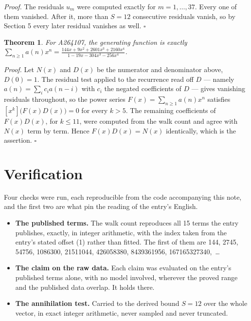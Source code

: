 \documentclass[11pt]{article}
\newtheorem{theorem}{Theorem}
\theoremstyle{definition}
\begin{document}
{\itshape Proof.} The residuals $u_m$ were computed exactly for $m = 1,\dots,37$. Every one of them vanished. After it, more than $S = 12$ consecutive residuals vanish, so by Section 5 every later residual vanishes as well. $\square$

\begin{theorem} For A264107, the generating function is exactly $\sum_{n\ge 1} a(n)x^n = \frac{144x + 9x^{2} + 2601x^{3} + 2160x^{4}}{1 - 19x - 304x^{3} - 256x^{4}}$.\end{theorem}

{\itshape Proof.} Let $N(x)$ and $D(x)$ be the numerator and denominator above, $D(0)=1$. The residual test applied to the recurrence read off $D$ --- namely $a(n) = \sum_i c_i a(n-i)$ with $c_i$ the negated coefficients of $D$ --- gives vanishing residuals throughout, so the power series $F(x)=\sum_{n\ge 1}a(n)x^n$ satisfies $[x^k]\bigl(F(x)D(x)\bigr) = 0$ for every $k > 5$. The remaining coefficients of $F(x)D(x)$, for $k \le 11$, were computed from the walk count and agree with $N(x)$ term by term. Hence $F(x)D(x) = N(x)$ identically, which is the assertion. $\square$

\section{Verification}

Four checks were run, each reproducible from the code accompanying this note, and the first two are what pin the reading of the entry's English.

\begin{itemize}

\item {\bfseries The published terms.} The walk count reproduces all 15 terms the entry publishes, exactly, in integer arithmetic, with the index taken from the entry's stated offset (1) rather than fitted. The first of them are 144, 2745, 54756, 1086300, 21511044, 426058380, 8439361956, 167165327340,~\dots

\item {\bfseries The claim on the raw data.} Each claim was evaluated on the entry's published terms alone, with no model involved, wherever the proved range and the published data overlap. It holds there.

\item {\bfseries The annihilation test.} Carried to the derived bound $S = 12$ over the whole vector, in exact integer arithmetic, never sampled and never truncated.

\end{itemize}
\end{document}
